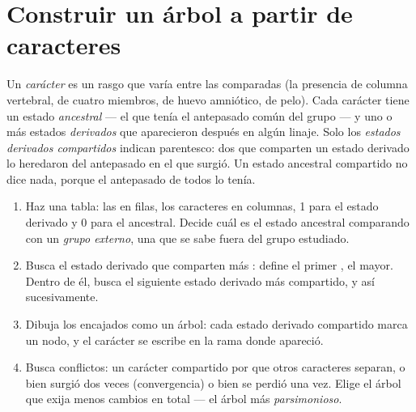 \section{Construir un árbol a partir de caracteres}

\begin{definition}\label{def:g12:phylogenetic-trees:states}
Un \emph{carácter} es un rasgo que varía entre las  comparadas
(la presencia de columna vertebral, de cuatro miembros, de huevo
amniótico, de pelo). Cada carácter tiene un estado \emph{ancestral} ---
el que tenía el antepasado común del grupo --- y uno o más estados
\emph{derivados} que aparecieron después en algún linaje. Solo los
\emph{estados derivados compartidos} indican parentesco: dos 
que comparten un estado derivado lo heredaron del antepasado en el que
surgió. Un estado ancestral compartido no dice nada, porque el
antepasado de todos lo tenía.
\end{definition}

\begin{method}\label{met:g12:phylogenetic-trees:build}
\begin{enumerate}
  \item Haz una tabla: las  en filas, los caracteres en
        columnas, 1 para el estado derivado y 0 para el ancestral.
        Decide cuál es el estado ancestral comparando con un
        \emph{grupo externo}, una  que se sabe fuera del grupo
        estudiado.
  \item Busca el estado derivado que comparten más : define el
        primer , el mayor. Dentro de él, busca el siguiente estado
        derivado más compartido, y así sucesivamente.
  \item Dibuja los  encajados como un árbol: cada estado derivado
        compartido marca un nodo, y el carácter se escribe en la rama
        donde apareció.
  \item Busca conflictos: un carácter compartido por  que otros
        caracteres separan, o bien surgió dos veces (convergencia) o
        bien se perdió una vez. Elige el árbol que exija menos cambios
        en total --- el árbol más \emph{parsimonioso}.
\end{enumerate}
\end{method}

